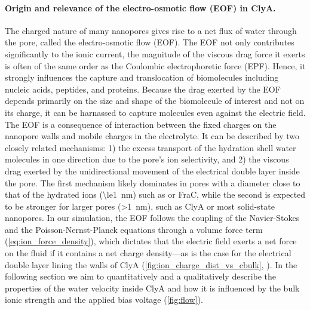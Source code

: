 \documentclass[journal=ancac3,manuscript=article,etalmode=truncate,maxauthors=0,layout=onecolumn]{achemso}
\begin{document}
\paragraph{Origin and relevance of the electro-osmotic flow (EOF) in ClyA.}
%
The charged nature of many nanopores gives rise to a net flux of water through the pore, called the
electro-osmotic flow (EOF).\cite{Qiao-Aluru-2003,Thompson-2003,Mao-2014} The EOF not only contributes
significantly to the ionic current, the magnitude of the viscous drag force it exerts is often of the same
order as the Coulombic electrophoretic force (EPF). Hence, it strongly influences the capture and
translocation of biomolecules including nucleic acids,\cite{Wong-2007,Luan-2008,Firnkes-2010}
peptides,\cite{Huang-2017,Li-2018,Huang-2019} and
proteins\cite{Soskine-2012,Soskine-2013,VanMeervelt-2014,Soskine-Biesemans-2015,Biesemans-Soskine-2015,Wloka-2017,Galenkamp-2018,Willems-Ruic-Biesemans-2019}.
Because the drag exerted by the EOF depends primarily on the size and shape of the biomolecule of interest and
not on its charge,\cite{Willems-Ruic-Biesemans-2019} it can be harnassed to capture molecules even against the
electric field.\cite{Soskine-2012} The EOF is a consequence of interaction between the fixed charges on the
nanopore walls and mobile charges in the electrolyte. It can be described by two closely related mechanisms:
1) the excess transport of the hydration shell water molecules in one direction due to the pore's ion
selectivity, and 2) the viscous drag exerted by the unidirectional movement of the electrical double layer
inside the pore. The first mechanism likely dominates in pores with a diameter close to that of the hydrated
ions (\SI{\le1}{\nm}) such as \ahl or FraC,\cite{Huang-2017,Huang-2019} while the second is expected to be
stronger for larger pores (\SI{>1}{\nm}), such as ClyA\cite{Soskine-2012,Willems-Ruic-Biesemans-2019} or most
solid-state nanopores.\cite{Mao-2014,Laohakunakorn-2015} In our simulation, the EOF follows the coupling of
the Navier-Stokes and the Poisson-Nernst-Planck equations through a volume force term
(\cref{eq:ion_force_density}), which dictates that the electric field exerts a net force on the fluid if it
contains a net charge density---as is the case for the electrical double layer lining the walls of ClyA
(\cref{fig:ion_charge_dist_vs_cbulk}, ). In the following section we aim to quantitatively and a qualitatively
describe the properties of the water velocity inside ClyA and how it is influenced by the bulk ionic strength
and the applied bias voltage (\cref{fig:flow}).
\end{document}
